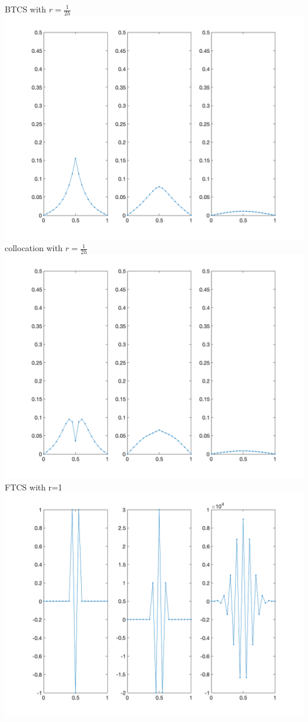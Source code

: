 \documentclass{article}
\begin{document}
BTCS with $r=\frac{1}{2h}$\\
\includegraphics[scale = 0.25]{BTCS_2h.png}\\
collocation with $r=\frac{1}{2h}$\\
\includegraphics[scale = 0.25]{collocation_2h.png}\\
FTCS with r=1\\
\includegraphics[scale = 0.25]{FTCS_1.png}\\
\end{document}
